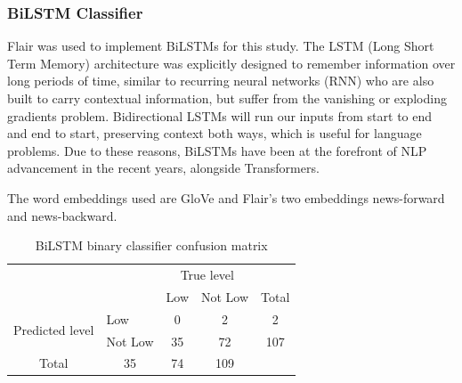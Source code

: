 \documentclass[12pt, a4paper]{article}
\begin{document}

\subsubsection{BiLSTM Classifier}

Flair\cite{flair} was used to implement BiLSTMs\cite{bilstm} for this study. The LSTM (Long Short Term Memory) architecture was explicitly designed to remember information over long periods of time, similar to recurring neural networks (RNN) who are also built to carry contextual information, but suffer from the vanishing or exploding gradients problem. Bidirectional LSTMs will run our inputs from start to end and end to start, preserving context both ways, which is useful for language problems. Due to these reasons, BiLSTMs have been at the forefront of NLP advancement in the recent years, alongside Transformers.

The word embeddings used are GloVe\cite{glove} and Flair's two embeddings\cite{flair_embeddings} news-forward and news-backward. 

\begin{table}[ht]
\centering
\begin{tabular}{l|l|c|c|c}
\multicolumn{2}{c}{}&\multicolumn{2}{c}{True level}&\\
\cline{3-4}
\multicolumn{2}{c|}{}&Low&Not Low&\multicolumn{1}{c}{Total}\\
\cline{2-4}
\multirow{2}{*}{Predicted level}& Low & 0 & 2 & 2\\
\cline{2-4}
& Not Low & 35 & 72 & 107\\
\cline{2-4}
\multicolumn{1}{c}{Total} & \multicolumn{1}{c}{35} & \multicolumn{    1}{c}{74} & \multicolumn{1}{c}{109}\\
\end{tabular}
\caption{BiLSTM binary classifier confusion matrix}
\label{table:bilstm_low}
\end{table}
\end{document}
